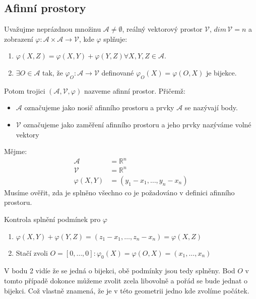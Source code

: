 \subsection{Afinní prostory}
\begin{definition}
    Uvažujme neprázdnou množinu $\mathcal{A} \neq \emptyset$, 
    reálný vektorový prostor $\mathcal{V}$, $dim\,\mathcal{V} = n$ a zobrazení $\varphi: \mathcal{A} 
    \times \mathcal{A} \rightarrow \mathcal{V}$, kde $\varphi$ splňuje:
    \begin{enumerate}[]
        \item $\varphi(X, Z) = \varphi(X, Y) + \varphi(Y, Z) \forall X, Y, Z \in \mathcal{A}$. 
        \item $\exists O \in \mathcal{A}$ tak, že 
        $\varphi_{O}: \mathcal{A} \rightarrow \mathcal{V}$ definované $\varphi_O(X) = \varphi(O, X)$
        je bijekce. %
    \end{enumerate}

    Potom trojici $(\mathcal{A}, \mathcal{V}, \varphi)$ nazveme afinní prostor.
    Přičemž:
    \begin{itemize}
        \item $\mathcal{A}$ označujeme jako nosič afinního prostoru a prvky $\mathcal{A}$ se
        nazývají body.
        \item $\mathcal{V}$ označujeme jako zaměření afinního prostoru a jeho prvky nazýváme
            volné vektory
    \end{itemize}
\end{definition}

\begin{example}
    Mějme:
    \begin{align*}
        \mathcal{A} &= \mathbb{R}^n\\
        \mathcal{V} &= \mathbb{R}^n\\
        \varphi(X, Y) &= (y_1 - x_1, \ldots, y_n - x_n)
    \end{align*}
    Musíme ověřit, zda je splněno všechno co je požadováno v definici afinního prostoru.

    Kontrola splnění podmínek pro $\varphi$
    \begin{enumerate}
        \item $\varphi(X, Y) + \varphi(Y, Z) = (z_1 - x_1, \ldots, z_n - x_n) = \varphi(X, Z)$
        \item Stačí zvoli $O = [0, \ldots, 0]: \varphi_0(X) = \varphi(O, X) = (x_1, \ldots, x_n)$
    \end{enumerate}
    V bodu 2 vidíe že se jedná o bijekci, obě podmínky jsou tedy splněny. Bod $O$ v tomto případě dokonce
    můžeme zvolit zcela libovolně a pořád se bude jednat o bijekci. Což vlastně znamená, že je v této
    geometrii jedno kde zvolíme počátek.
\end{example}

